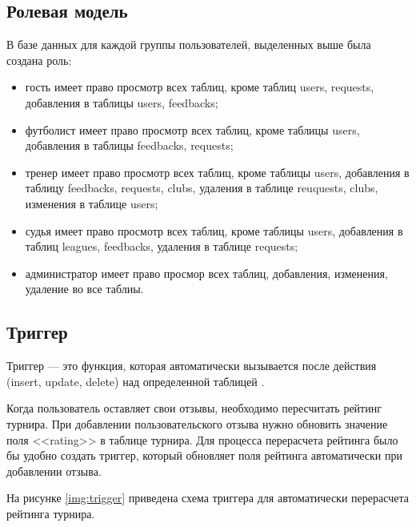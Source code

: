 \subsection{Ролевая модель}
В базе данных для каждой группы пользователей, выделенных выше была создана роль:
\begin{itemize}
	\item гость имеет право просмотр всех таблиц, кроме таблиц users, requests, добавления в таблицы users, feedbacks;
	\item футболист имеет право просмотр всех таблиц, кроме таблицы users, добавления в таблицы feedbacks, requests;
	\item тренер имеет право просмотр всех таблиц, кроме таблицы users, добавления в таблицу feedbacks, requests, clubs, удаления в таблице reuquests, clubs, изменения в таблице users;
	\item судья имеет право просмотр всех таблиц, кроме таблицы users, добавления в таблиц leagues, feedbacks, удаления в таблице requests;
	\item администратор имеет право просмор всех таблиц, добавления, изменения, удаление во все таблиы.
\end{itemize}

\subsection{Триггер}

Триггер --- это функция, которая автоматически вызывается после действия (insert, update, delete) над определенной таблицей \cite{light-model}. 

Когда пользователь оставляет свои отзывы, необходимо пересчитать рейтинг турнира.
При добавлении пользовательского отзыва нужно обновить значение поля <<rating>> в таблице турнира. Для процесса перерасчета рейтинга было бы удобно создать триггер, который обновляет поля рейтинга автоматически при добавлении отзыва.

На рисунке \ref{img:trigger} приведена схема триггера для автоматически перерасчета рейтинга турнира.

